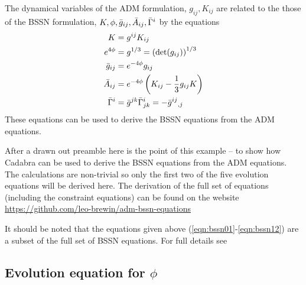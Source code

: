 \documentclass[a4paper,12pt]{article}
\numberwithin{equation}{section}%
\begin{document}
The dynamical variables of the ADM formulation, $g_{ij}, K_{ij}$ are related to the those of
the BSSN formulation, ${K},\phi,{\bar{g}}_{ij},{\bar{A}}_{ij},{\bar{\Gamma}}^{i}$ by the equations
\begin{align}
   {K} & = g^{ij} K_{ij}\label{eqn:bssn08}\\
   e^{4\phi} &= g^{1/3} = \left(\det(g_{ij})\right)^{1/3}\label{eqn:bssn09}\\
   {\bar{g}}_{ij} &= e^{-4\phi} g_{ij}\label{eqn:bssn10}\\
   {\bar{A}}_{ij} &= e^{-4\phi} \left(K_{ij} - \frac{1}{3} g_{ij} {K}\right)\label{eqn:bssn11}\\
   {\bar{\Gamma}}^{i} &= {\bar{g}}^{jk} {\bar{\Gamma}}^{i}_{jk} = - {\bar{g}}^{ij}{}_{,j}\label{eqn:bssn12}
\end{align}
These equations can be used to derive the BSSN equations from the ADM equations.

After a drawn out preamble here is the point of this example -- to show how Cadabra can be
used to derive the BSSN equations from the ADM equations. The calculations are non-trivial
so only the first two of the five evolution equations will be derived here. The derivation
of the full set of equations (including the constraint equations) can be found on the
website \url{https://github.com/leo-brewin/adm-bssn-equations}

It should be noted that the equations given above (\ref{eqn:bssn01}-\ref{eqn:bssn12}) are a
subset of the full set of BSSN equations. For full details see
\cite{alcubierre:2000-03,alcubierre:2003-01}

\subsection{Evolution equation for $\phi$}
\end{document}
